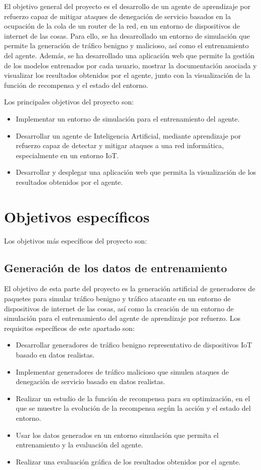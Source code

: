 El objetivo general del proyecto es el desarrollo de un agente de aprendizaje por refuerzo capaz de mitigar ataques de denegación de servicio basados en la ocupación de la cola de un router de la red, en un entorno de dispositivos de internet de las cosas. Para ello, se ha desarrollado un entorno de simulación que permite la generación de tráfico benigno y malicioso, así como el entrenamiento del agente. Además, se ha desarrollado una aplicación web que permite la gestión de los modelos entrenados por cada usuario, mostrar la documentación asociada y visualizar los resultados obtenidos por el agente, junto con la visualización de la función de recompensa y el estado del entorno.

Los principales objetivos del proyecto son:
\begin{itemize}
    \item Implementar un entorno de simulación para el entrenamiento del agente.
    \item Desarrollar un agente de Inteligencia Artificial, mediante aprendizaje por refuerzo capaz de detectar y mitigar ataques a una red informática, especialmente en un entorno IoT.
    \item Desarrollar y desplegar una aplicación web que permita la visualización de los resultados obtenidos por el agente.
\end{itemize}

\section{Objetivos específicos}
Los objetivos más específicos del proyecto son:

\subsection{Generación de los datos de entrenamiento}
El objetivo de esta parte del proyecto es la generación artificial de generadores de paquetes para simular tráfico benigno y tráfico atacante en un entorno de dispositivos de internet de las cosas, así como la creación de un entorno de simulación para el entrenamiento del agente de aprendizaje por refuerzo. Los requisitos específicos de este apartado son:
\begin{itemize}
    \item Desarrollar generadores de tráfico benigno representativo de dispositivos IoT basado en datos realistas.
    \item Implementar generadores de tráfico malicioso que simulen ataques de denegación de servicio basado en datos realistas.
    \item Realizar un estudio de la función de recompensa para su optimización, en el que se muestre la evolución de la recompensa según la acción y el estado del entorno.
    \item Usar los datos generados en un entorno simulación que permita el entrenamiento y la evaluación del agente.
    \item Realizar una evaluación gráfica de los resultados obtenidos por el agente.
\end{itemize}

